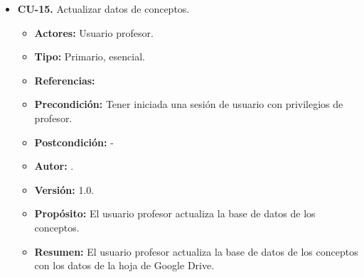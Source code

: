 \begin{itemize}
\newpage






  \item \textbf{CU-15.} Actualizar datos de conceptos.
  \begin{itemize}
    \item \textbf{Actores:} Usuario profesor.
    \item \textbf{Tipo:} Primario, esencial.
    \item \textbf{Referencias:}
    \item \textbf{Precondición:} Tener iniciada una sesión de usuario con privilegios de profesor.
    \item \textbf{Postcondición:} - 
    \item \textbf{Autor:} \autor.
    \item \textbf{Versión:} 1.0.
    \item \textbf{Propósito:} El usuario profesor actualiza la base de datos de los conceptos.
    \item \textbf{Resumen:} El usuario profesor actualiza la base de datos de los conceptos con los datos de la hoja de Google Drive.


\end{itemize}
\end{itemize}
